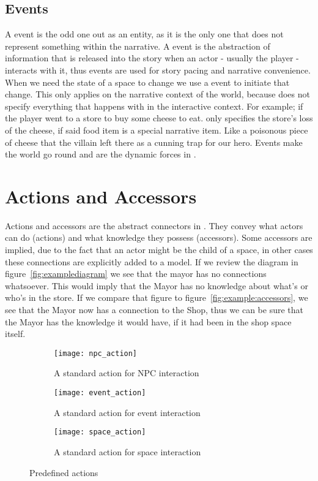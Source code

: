 \subsection{Events}
A event is the odd one out as an entity, as it is the only one that does not represent something within the narrative. A event is the abstraction of information that is released into the story when an actor - usually the player - interacts with it, thus events are used for story pacing and narrative convenience. When we need the state of a space to change we use a event to initiate that change. This only applies on the narrative context of the world, because \diage does not specify everything that happens with in the interactive context. For example; if the player went to a store to buy some cheese to eat. \diage only specifies the store's loss of the cheese, if said food item is a special narrative item. Like a poisonous piece of cheese that the villain left there as a cunning trap for our hero. Events make the world go round and are the dynamic forces in \diage.

\section{Actions and Accessors}
\label{sec:actions_and_accessors}
Actions and accessors are the abstract connectors in \diage. They convey what actors can do (actions) and what knowledge they possess (accessors). Some accessors are implied, due to the fact that an actor might be the child of a space, in other cases these connections are explicitly added to a \diage model. If we review the diagram in figure~\ref{fig:examplediagram} we see that the mayor has no connections whatsoever. This would imply that the Mayor has no knowledge about what's or who's in the store. If we compare that figure to figure~\ref{fig:example:accessors}, we see that the Mayor now has a connection to the Shop, thus we can be sure that the Mayor has the knowledge it would have, if it had been in the shop space itself.

\begin{figure}[ht]
	\centering
	\begin{subfigure}[b]{0.3\textwidth}
		\texttt{[image: npc\_action]}
		\caption{A standard action for NPC interaction}\label{fig:actions:npc}
	\end{subfigure}
	\begin{subfigure}[b]{0.3\textwidth}
		\texttt{[image: event\_action]}
		\caption{A standard action for event interaction}\label{fig:actions:event}
	\end{subfigure}
	\begin{subfigure}[b]{0.3\textwidth}
		\texttt{[image: space\_action]}
		\caption{A standard action for space interaction}\label{fig:actions:space}
	\end{subfigure}
	\caption{Predefined actions}\label{fig:actions}
\end{figure}

